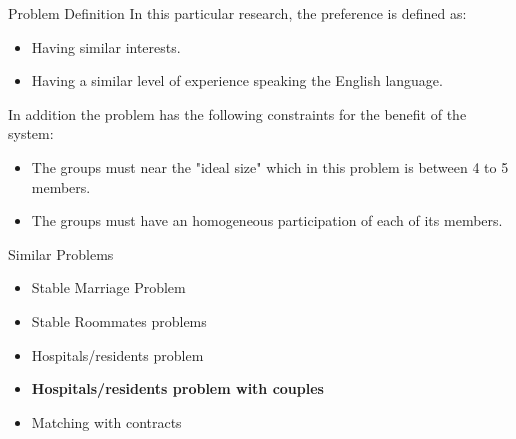 \documentclass{beamer}
\begin{document}
        
    \begin{frame}{Problem Definition}
        In this particular research, the preference is defined as:
        \begin{itemize}
            \item Having similar interests.
            \item Having a similar level of experience speaking the English language.
        \end{itemize}

        
        In addition the problem has the following constraints for the benefit of the system:
        \begin{itemize}
            \item The groups must near the "ideal size" which in this problem is between 4 to 5 members.
            \item The groups must have an homogeneous participation of each of its members.
        \end{itemize}
    \end{frame}
    
    \begin{frame}{Similar Problems}
        
        
        \begin{itemize}
            \item Stable Marriage Problem \cite{10.2307/2312726,McVitie:1971:SMP:362619.362631}
            \item Stable Roommates problems \cite{ROTH2005151,Irving:2007:CRP:1240328.1240414,kujansuu1999stable}
            \item Hospitals/residents problem \cite{gale1985some,roth1984evolution,gusfield1989stable}
            \item \textbf{Hospitals/residents problem with couples} \cite{McDermid2010,10.1007/978-3-319-07959-2_2}
            \item Matching with contracts \cite{matching_with_contracts}
        \end{itemize}
        
    \end{frame}
\end{document}

